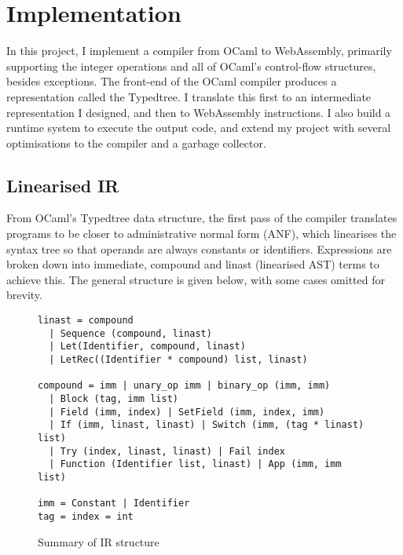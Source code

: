 \chapter{Implementation}

In this project, I implement a compiler from OCaml to WebAssembly, primarily supporting the integer operations and all of OCaml's control-flow structures, besides exceptions. The front-end of the OCaml compiler produces a representation called the Typedtree. I translate this first to an intermediate representation I designed, and then to WebAssembly instructions. I also build a runtime system to execute the output code, and extend my project with several optimisations to the compiler and a garbage collector.


\section{Linearised IR}
From OCaml's Typedtree data structure, the first pass of the compiler translates programs to be closer to administrative normal form (ANF), which linearises the syntax tree so that operands are always constants or identifiers. Expressions are broken down into immediate, compound and linast (linearised AST) terms to achieve this. The general structure is given below, with some cases omitted for brevity.

\begin{figure}[H]
\begin{verbatim}
linast = compound 
  | Sequence (compound, linast)
  | Let(Identifier, compound, linast) 
  | LetRec((Identifier * compound) list, linast)

compound = imm | unary_op imm | binary_op (imm, imm) 
  | Block (tag, imm list)
  | Field (imm, index) | SetField (imm, index, imm)
  | If (imm, linast, linast) | Switch (imm, (tag * linast) list)
  | Try (index, linast, linast) | Fail index
  | Function (Identifier list, linast) | App (imm, imm list)

imm = Constant | Identifier
tag = index = int
\end{verbatim}
\caption{Summary of IR structure}
\end{figure}

%

